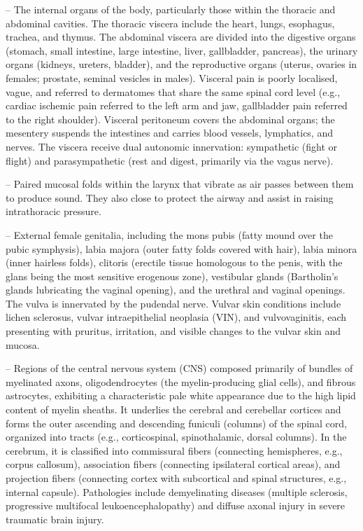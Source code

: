 -- The internal organs of the body, particularly those within the thoracic and abdominal cavities. The thoracic viscera include the heart, lungs, esophagus, trachea, and thymus. The abdominal viscera are divided into the digestive organs (stomach, small intestine, large intestine, liver, gallbladder, pancreas), the urinary organs (kidneys, ureters, bladder), and the reproductive organs (uterus, ovaries in females; prostate, seminal vesicles in males). Visceral pain is poorly localised, vague, and referred to dermatomes that share the same spinal cord level (e.g., cardiac ischemic pain referred to the left arm and jaw, gallbladder pain referred to the right shoulder). Visceral peritoneum covers the abdominal organs; the mesentery suspends the intestines and carries blood vessels, lymphatics, and nerves. The viscera receive dual autonomic innervation: sympathetic (fight or flight) and parasympathetic (rest and digest, primarily via the vagus nerve).

-- Paired mucosal folds within the larynx that vibrate as air passes between them to produce sound. They also close to protect the airway and assist in raising intrathoracic pressure.

-- External female genitalia, including the mons pubis (fatty mound over the pubic symphysis), labia majora (outer fatty folds covered with hair), labia minora (inner hairless folds), clitoris (erectile tissue homologous to the penis, with the glans being the most sensitive erogenous zone), vestibular glands (Bartholin's glands lubricating the vaginal opening), and the urethral and vaginal openings. The vulva is innervated by the pudendal nerve. Vulvar skin conditions include lichen sclerosus, vulvar intraepithelial neoplasia (VIN), and vulvovaginitis, each presenting with pruritus, irritation, and visible changes to the vulvar skin and mucosa.

-- Regions of the central nervous system (CNS) composed primarily of bundles of myelinated axons, oligodendrocytes (the myelin-producing glial cells), and fibrous astrocytes, exhibiting a characteristic pale white appearance due to the high lipid content of myelin sheaths. It underlies the cerebral and cerebellar cortices and forms the outer ascending and descending funiculi (columns) of the spinal cord, organized into tracts (e.g., corticospinal, spinothalamic, dorsal columns). In the cerebrum, it is classified into commissural fibers (connecting hemispheres, e.g., corpus callosum), association fibers (connecting ipsilateral cortical areas), and projection fibers (connecting cortex with subcortical and spinal structures, e.g., internal capsule). Pathologies include demyelinating diseases (multiple sclerosis, progressive multifocal leukoencephalopathy) and diffuse axonal injury in severe traumatic brain injury.

